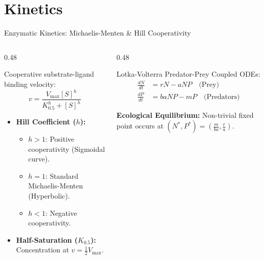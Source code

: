 \documentclass[aspectratio=169, 9pt]{beamer}
\begin{document}
\section{Kinetics}
\begin{frame}{Enzymatic Kinetics: Michaelis-Menten \& Hill Cooperativity}
    \begin{columns}[c]
        \begin{column}{0.48\textwidth}
            \par\vspace{0.2em}
            \scriptsize
            Cooperative substrate-ligand binding velocity:
            \begin{equation*}
                v = \frac{V_{\max} [S]^h}{K_{0.5}^h + [S]^h}
            \end{equation*}
            \vspace{0.1em}
            \begin{itemize}\setlength{\itemsep}{1.5pt}
                \item \textbf{Hill Coefficient ($h$):}
                \begin{itemize}\setlength{\itemsep}{1pt}
                    \item $h > 1$: Positive cooperativity (Sigmoidal curve).
                    \item $h = 1$: Standard Michaelis-Menten (Hyperbolic).
                    \item $h < 1$: Negative cooperativity.
                \end{itemize}
                \item \textbf{Half-Saturation ($K_{0.5}$):} Concentration at $v = \frac{1}{2} V_{\max}$.
            \end{itemize}
        \end{column}
        \begin{column}{0.48\textwidth}
            \par\vspace{0.2em}
            \scriptsize
            Lotka-Volterra Predator-Prey Coupled ODEs:
            \begin{align*}
                \frac{dN}{dt} &= rN - aNP \quad \text{(Prey)} \\
                \frac{dP}{dt} &= baNP - mP \quad \text{(Predators)}
            \end{align*}
            \vspace{0.1em}
            \begin{takeaway}
                \textbf{Ecological Equilibrium:} Non-trivial fixed point occurs at $(N^*, P^*) = \left(\frac{m}{ba}, \frac{r}{a}\right)$.
            \end{takeaway}
        \end{column}
    \end{columns}
\end{frame}
\end{document}
